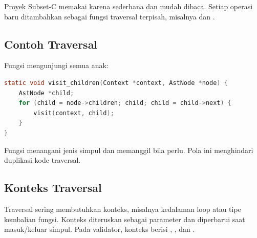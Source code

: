 Proyek Subset-C memakai  karena sederhana dan mudah
dibaca. Setiap operasi baru ditambahkan sebagai fungsi traversal
terpisah, misalnya  dan .

\subsection{Contoh Traversal}

Fungsi  mengunjungi semua anak:
\begin{lstlisting}[language=C]
static void visit_children(Context *context, AstNode *node) {
    AstNode *child;
    for (child = node->children; child; child = child->next) {
        visit(context, child);
    }
}
\end{lstlisting}
Fungsi  menangani jenis simpul dan memanggil
 bila perlu. Pola ini menghindari duplikasi
kode traversal.

\subsection{Konteks Traversal}

Traversal sering membutuhkan konteks, misalnya kedalaman loop atau
tipe kembalian fungsi. Konteks diteruskan sebagai parameter dan
diperbarui saat masuk/keluar simpul. Pada validator, konteks berisi
, , dan .
